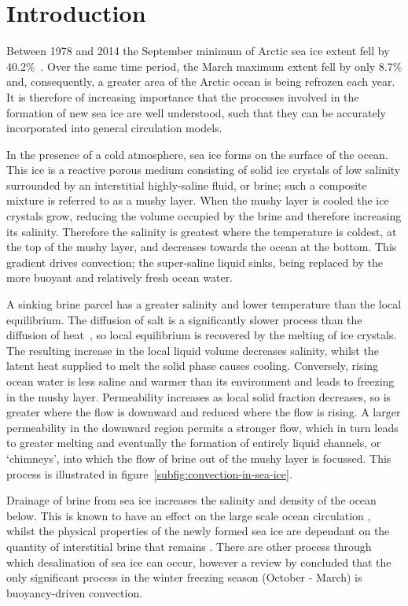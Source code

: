\documentclass[11pt,twocolumn]{article}
\begin{document}
  

\section{Introduction}
\label{sec:intro}
Between 1978 and 2014 the September minimum of Arctic sea ice extent fell by 40.2\%~\citep*{fetterer-02}. Over the same time period, the March maximum extent fell by only 8.7\% and, consequently, a greater area of the Arctic ocean is being refrozen each year. It is therefore of increasing importance that the processes involved in the formation of new sea ice are well understood, such that they can be accurately incorporated into general circulation models. 

In the presence of a cold atmosphere, sea ice forms on the surface of the ocean. This ice is a reactive porous medium consisting of solid ice crystals of low salinity surrounded by an interstitial highly-saline fluid, or brine; such a composite mixture is referred to as a mushy layer. When the mushy layer is cooled the ice crystals grow, reducing the volume occupied by the brine and therefore increasing its salinity. Therefore the salinity is greatest where the temperature is coldest, at the top of the mushy layer, and decreases towards the ocean at the bottom. This gradient drives convection; the super-saline liquid sinks, being replaced by the more buoyant and relatively fresh ocean water. 

A sinking brine parcel has a greater salinity and lower temperature than the local equilibrium. The diffusion of salt is a significantly slower process than the diffusion of heat~\citep*{worster-97}, so local equilibrium is recovered by the melting of ice crystals. The resulting increase in the local liquid volume decreases salinity, whilst the latent heat supplied to melt the solid phase causes cooling. Conversely, rising ocean water is less saline and warmer than its environment and leads to freezing in the mushy layer. Permeability increases as local solid fraction decreases, so is greater where the flow is downward and reduced where the flow is rising. A larger permeability in the downward region permits a stronger flow, which in turn leads to greater melting and eventually the formation of entirely liquid channels, or `chimneys', into which the flow of brine out of the mushy layer is focussed. This process is illustrated in figure~\ref{subfig:convection-in-sea-ice}.

Drainage of brine from sea ice increases the salinity and density of the ocean below. This is known to have an effect on the large scale ocean circulation \citep*{brandon-et-al-10}, whilst the physical properties of the newly formed sea ice are dependant on the quantity of interstitial brine that remains \citep*{petrich-eicken-10}. There are other process through which desalination of sea ice can occur, however a review by \citet*{notz-worster-09} concluded that the only significant process in the winter freezing season (October - March) is buoyancy-driven convection. 
\end{document}
